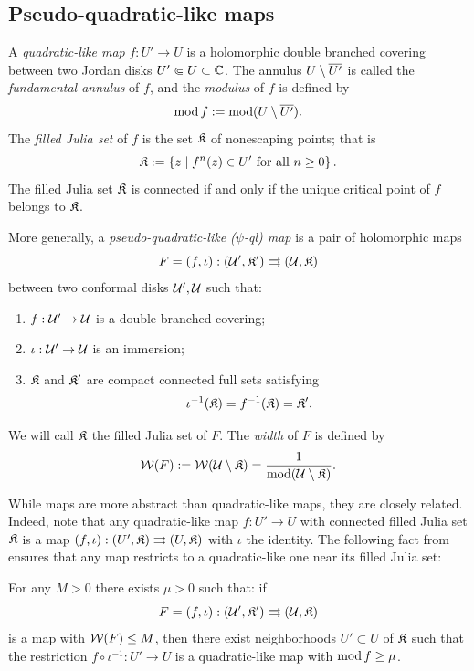 \documentclass[12pt]{amsart}
\begin{document}
\subsection{Pseudo-quadratic-like maps}\label{sec:pql maps}



A \textit{quadratic-like map} $f: U'\to U$ is a holomorphic double branched covering between two Jordan disks $U'\Subset U\subset \mathbb C$. 
The annulus $U\setminus \overline{U'}$ is called the \textit{fundamental annulus} of $f$,
and the \textit{modulus} of $f$ is defined by $$\operatorname{mod} f :=\operatorname{mod}(U\setminus \overline{U'}).$$
The \textit{filled Julia set} of $f$ is the set $\mathfrak{K}$ of nonescaping points; that is 
$$\mathfrak{K}:= \left\{ z \mid f^n(z)\in U' \text{ for all }n\geq 0 \right\}.$$
The filled Julia set $\mathfrak{K}$ is connected if and only if the unique critical point of $f$ belongs to $\mathfrak{K}$.


More generally, a \textit{pseudo-quadratic-like ($\psi$-ql) map}  is a pair of holomorphic maps $$F= (f, \iota): (\mathcal U', \mathfrak{K}')\rightrightarrows (\mathcal U, \mathfrak{K})$$ between two conformal disks $\mathcal U', \mathcal U$ such that:
\begin{enumerate}
	\item $f: \mathcal U'\to \mathcal U$ is a double branched covering;
	\item $\iota: \mathcal U'\to \mathcal U$ is an immersion;
	\item $\mathfrak{K}$ and $\mathfrak{K}'$ are compact connected full sets satisfying 
	$$\iota^{-1}(\mathfrak{K}) = f^{-1}(\mathfrak{K})= \mathfrak{K}'.$$
\end{enumerate}
We will call $\mathfrak{K}$  the filled Julia set of $F$.
The \textit{width} of $F$  is defined by
$$\mathcal W(F) := \mathcal W(\mathcal U\setminus \mathfrak{K}) = \frac{1}{\operatorname{mod} (\mathcal U\setminus \mathfrak{K})}.$$


While \pql maps are more abstract than quadratic-like maps, they are closely related. Indeed, note that any quadratic-like map $f:U'\to U$ with connected filled Julia set $\mathfrak{K}$ is a \pql map $(f, \iota): (U', \mathfrak{K})\rightrightarrows(U, \mathfrak{K})$ with $\iota$ the identity. The following fact from \cite[Theorem 7.3]{K06} ensures that any \pql map restricts to a quadratic-like one near its filled Julia set:

\begin{theorem}[Kahn]\label{thm:induced quadratic-like map}
	For any $M>0$ there exists $\mu>0$ such that: if  $$F= (f, \iota): (\mathcal U', \mathfrak{K}')\rightrightarrows (\mathcal U, \mathfrak{K})$$ is a \pql map with $\mathcal W(F)\leq M$, then there exist neighborhoods $U'\subset U$ of $\mathfrak{K}$ such that the restriction $f\circ \iota^{-1}: U'\to U$ is a quadratic-like map with $\operatorname{mod} f \geq  \mu$.
\end{theorem}
\end{document}
